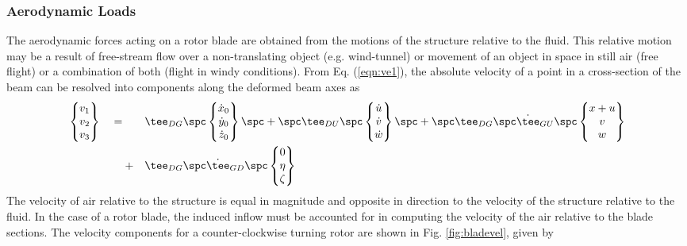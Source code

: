 \subsubsection{Aerodynamic Loads}
\label{sec:aerloads}
The aerodynamic forces acting on a rotor blade are obtained from the motions of the structure relative to the fluid. This relative motion may be a result of free-stream flow over a non-translating object (e.g. wind-tunnel) or movement of an object in space in still air (free flight) or a combination of both (flight in windy conditions). From Eq. (\ref{eqn:ve1}), the absolute velocity of a point in a cross-section of the beam can be resolved into components along the deformed beam axes as 
\begin{equation*}
\begin{aligned}
\begin{Bmatrix} v_1 \\ v_2 \\ v_3 \end{Bmatrix} \quad = \qquad & \tee_{DG} \spc \begin{Bmatrix} \dot{x}_0 \\ \dot{y}_0 \\ \dot{z}_0 \end{Bmatrix} \spc + \spc \tee_{DU} \spc \begin{Bmatrix} \dot{u} \\ \dot{v} \\ \dot{w} \end{Bmatrix} \spc + \spc \tee_{DG} \spc \dot{\tee}_{GU} \spc \begin{Bmatrix} x+u \\ v \\ w \end{Bmatrix} \\
+ \quad & \tee_{DG} \spc \dot{\tee}_{GD} \spc \begin{Bmatrix} 0 \\ \eta \\ \zeta \end{Bmatrix} 
\end{aligned}
\end{equation*}
The velocity of air relative to the structure is equal in magnitude and opposite in direction to the velocity of the structure relative to the fluid. In the case of a rotor blade, the induced inflow must be accounted for in computing the velocity of the air relative to the blade sections. The velocity components for a counter-clockwise turning rotor are shown in Fig. \ref{fig:bladevel}, given by 
